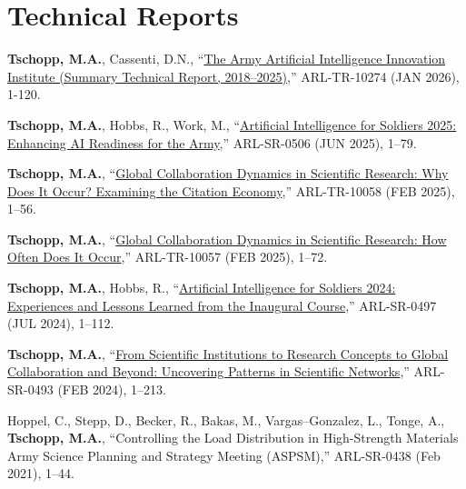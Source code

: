 \section{\sc Technical Reports}

\begin{cvlist}
\setlength{\itemsep}{0in}
\setlength{\parsep}{0in} 
\setlength{\parskip}{0in}
\setlength{\topsep}{0in} 
\setlength{\partopsep}{0in} 
\setlength{\leftmargin}{0.2in}

\item
\textbf{Tschopp, M.A.}, Cassenti, D.N., ``\href{https://doi.org/10.5281/zenodo.18443859}{The Army Artificial Intelligence Innovation Institute (Summary Technical Report, 2018–2025)},'' ARL-TR-10274 (JAN 2026), 1-120. 

\item
\textbf{Tschopp, M.A.}, Hobbs, R., Work, M., ``\href{https://doi.org/10.5281/zenodo.18443653}{Artificial Intelligence for Soldiers 2025: Enhancing AI Readiness for the Army},'' ARL-SR-0506 (JUN 2025), 1--79.

\item
\textbf{Tschopp, M.A.}, ``\href{https://doi.org/10.5281/zenodo.18443767}{Global Collaboration Dynamics in Scientific Research: Why Does It Occur? Examining the Citation Economy},'' ARL-TR-10058 (FEB 2025), 1--56.

\item
\textbf{Tschopp, M.A.}, ``\href{https://doi.org/10.5281/zenodo.18443725}{Global Collaboration Dynamics in Scientific Research: How Often Does It Occur},'' ARL-TR-10057 (FEB 2025), 1--72.

\item
\textbf{Tschopp, M.A.}, Hobbs, R., ``\href{https://doi.org/10.5281/zenodo.18443551}{Artificial Intelligence for Soldiers 2024: Experiences and Lessons Learned from the Inaugural Course},'' ARL-SR-0497 (JUL 2024), 1--112.

\item
\textbf{Tschopp, M.A.}, ``\href{https://apps.dtic.mil/sti/trecms/pdf/AD1222844.pdf}{From Scientific Institutions to Research Concepts to Global Collaboration and Beyond: Uncovering Patterns in Scientific Networks},'' ARL-SR-0493 (FEB 2024), 1--213.

\item
Hoppel, C., Stepp, D., Becker, R., Bakas, M., Vargas--Gonzalez, L., Tonge, A., \textbf{Tschopp, M.A.}, ``Controlling the Load Distribution in High-Strength Materials Army Science Planning and Strategy Meeting (ASPSM),'' ARL-SR-0438 (Feb 2021), 1--44.


\end{cvlist}

